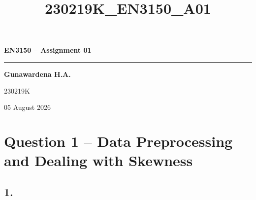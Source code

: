 \documentclass[11pt]{article}
\title{230219K\_EN3150\_A01}
\begin{document}
\begin{titlepage}
\thispagestyle{empty}
\centering

\vspace*{5.0cm}

{\Large\bfseries\color{reportnavy} EN3150 -- Assignment 01\par}
\vspace{0.45cm}
{\color{reportnavy}\rule{0.72\textwidth}{1.1pt}\par}

\vspace{2.0cm}

{\LARGE\bfseries Gunawardena H.A.\par}
\vspace{0.45cm}
{\Large 230219K\par}

\vfill

{\large 05 August 2026\par}
\vspace{1.2cm}

\end{titlepage}



\setcounter{page}{1}
\pagestyle{fancy}

    \section{Question 1 -- Data Preprocessing and Dealing with
Skewness}\label{question-1---data-preprocessing-and-dealing-with-skewness}

\subsection{1.}
\end{document}
